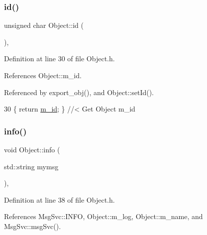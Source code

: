 \subsubsection{\texorpdfstring{id()}{id()}}
{\footnotesize\ttfamily unsigned char Object\+::id (\begin{DoxyParamCaption}{ }\end{DoxyParamCaption})\hspace{0.3cm}{\ttfamily [inline]}, {\ttfamily [inherited]}}



Definition at line 30 of file Object.\+h.



References Object\+::m\+\_\+id.



Referenced by export\+\_\+obj(), and Object\+::set\+Id().


\begin{DoxyCode}
30 \{ \textcolor{keywordflow}{return} \hyperlink{classObject_aca74b9dbfed7b5556ea2d56c65b6b6b0}{m\_id};         \} \textcolor{comment}{//< Get Object m\_id }
\end{DoxyCode}
\mbox{\label{classObject_a644fd329ea4cb85f54fa6846484b84a8}} 
\subsubsection{\texorpdfstring{info()}{info()}\hspace{0.1cm}{\footnotesize\ttfamily [1/2]}}
{\footnotesize\ttfamily void Object\+::info (\begin{DoxyParamCaption}\item[{std\+::string}]{mymsg }\end{DoxyParamCaption})\hspace{0.3cm}{\ttfamily [inline]}, {\ttfamily [inherited]}}



Definition at line 38 of file Object.\+h.



References Msg\+Svc\+::\+I\+N\+FO, Object\+::m\+\_\+log, Object\+::m\+\_\+name, and Msg\+Svc\+::msg\+Svc().



